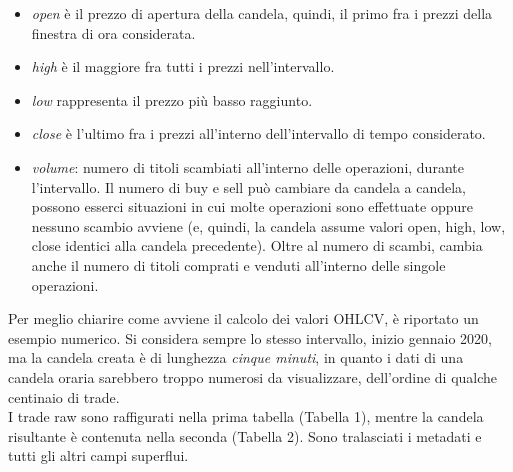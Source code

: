 \documentclass[a4paper,12pt]{report}
\begin{document}
\begin{itemize}
	\item \textit{open} è il prezzo di apertura della candela, quindi, il primo fra i prezzi della finestra di ora considerata.
	\item \textit{high} è il maggiore fra tutti i prezzi nell'intervallo.
	\item \textit{low} rappresenta il prezzo più basso raggiunto.
	\item \textit{close} è l'ultimo fra i prezzi all'interno dell'intervallo di tempo considerato.
	\item \textit{volume}: numero di titoli scambiati all'interno delle operazioni, durante l'intervallo. Il numero di buy e sell può cambiare da candela a candela, possono esserci situazioni in cui molte operazioni sono effettuate oppure nessuno scambio avviene (e, quindi, la candela assume valori open, high, low, close identici alla candela precedente). Oltre al numero di scambi, cambia anche il numero di titoli comprati e venduti all'interno delle singole operazioni.
\end{itemize}
Per meglio chiarire come avviene il calcolo dei valori OHLCV, è riportato un esempio numerico. Si considera sempre lo stesso intervallo, inizio gennaio 2020, ma la candela creata è di lunghezza \textit{cinque minuti}, in quanto i dati di una candela oraria sarebbero troppo numerosi da visualizzare, dell'ordine di qualche centinaio di trade.\\I trade raw sono raffigurati nella prima tabella (Tabella 1), mentre la candela risultante è contenuta nella seconda (Tabella 2). Sono tralasciati i metadati e tutti gli altri campi superflui.
\end{document}
